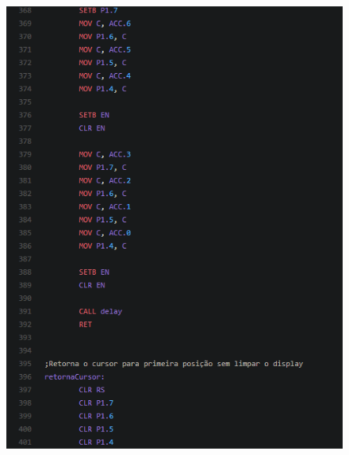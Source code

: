 \documentclass{article}
\begin{document}
\begin{figure}[H]
\hspace*{-1.0in}
\includegraphics[scale=1]{12.PNG}
\end{figure}
\end{document}
